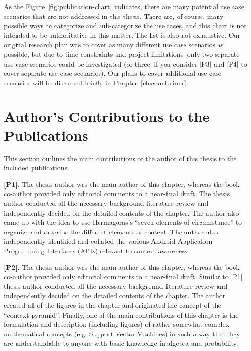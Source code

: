 As the Figure~\ref{fig:publication-chart} indicates, there are many potential use case scenarios that are not addressed in this thesis. There are, of course, many possible ways to categorize and sub-categorize the use cases, and this chart is not intended to be authoritative in this matter. The list is also not exhaustive. Our original research plan was to cover as many different use case scenarios as possible, but due to time constraints and project limitations, only two separate use case scenarios could be investigated (or three, if you consider [P3] and [P4] to cover separate use case scenarios). Our plans to cover additional use case scenarios will be discussed briefly in Chapter~\ref{ch:conclusions}.


\section{Author's Contributions to the Publications}
\label{sec:author_contributions}

This section outlines the main contributions of the author of this thesis to the included publications.

\textbf{[P1]:} The thesis author was the main author of this chapter, whereas the book co-author provided only editorial comments to a near-final draft. The thesis author conducted all the necessary background literature review and independently decided on the detailed contents of the chapter. The author also came up with the idea to use Hermagoras's ``seven elements of circumstance'' to organize and describe the different elements of context. The author also independently identified and collated the various Android Application Programming Interfaces (APIs) relevant to context awareness.

\textbf{[P2]:} The thesis author was the main author of this chapter, whereas the book co-author provided only editorial comments to a near-final draft. Similar to [P1] thesis author conducted all the necessary background literature review and independently decided on the detailed contents of the chapter. The author created all of the figures in the chapter and originated the concept of the ``context pyramid''. Finally, one of the main contributions of this chapter is the formulation and description (including figures) of rather somewhat complex mathematical concepts (e.g. Support Vector Machines) in such a way that they are understandable to anyone with basic knowledge in algebra and probability.

